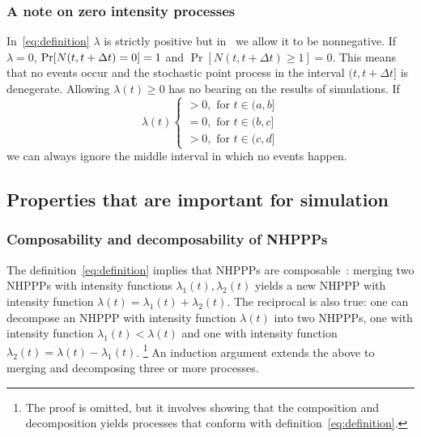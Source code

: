 \documentclass[article,nojss]{jss}\usepackage[]{graphicx}\usepackage[]{xcolor}
\begin{document}
\subsubsection{A note on zero intensity processes}
In~\eqref{eq:definition} $\lambda$ is strictly positive but in~ we allow it to be nonnegative. If $\lambda = 0$, $\\{\Pr[N(t, t + \Delta t) = 0] = 1}$ and ${\Pr[N(t, t + \Delta t) \ge 1] = 0}$. This means that no events occur and the stochastic point process in the interval $(t, t + \Delta t]$ is denegerate. Allowing $\lambda(t) \ge 0$ has no bearing on the results of simulations. If
\begin{equation*}
    \lambda(t)  \begin{cases}
    >0, \text{ for } t \in (a, b] \\
    =0, \text{ for } t \in (b, c] \\
    >0, \text{ for } t \in (c, d]
    \end{cases}
\end{equation*}
we can always ignore the middle interval in which no events happen.

\subsection{Properties that are important for simulation}\label{sec:properties}
\subsubsection{Composability and decomposability of NHPPPs}
The definition~\eqref{eq:definition} implies that NHPPPs are composable~\citep[par. 4.2]{cox1965theory}: merging two NHPPPs with intensity functions $\lambda_1(t), \lambda_2(t)$ yields a new NHPPP with intensity function $\lambda(t) = \lambda_1(t) + \lambda_2(t)$. The reciprocal is also true: one can decompose an NHPPP with intensity function $\lambda(t)$ into two NHPPPs, one with intensity function $\lambda_1(t) < \lambda(t)$ and one with intensity function ${\lambda_2(t) = \lambda(t)-\lambda_1(t)}$.%
\footnote{The proof is omitted, but it involves showing that the composition and decomposition yields processes that conform with definition~\eqref{eq:definition}.} An induction argument extends the above to merging and decomposing three or more processes.
\end{document}
